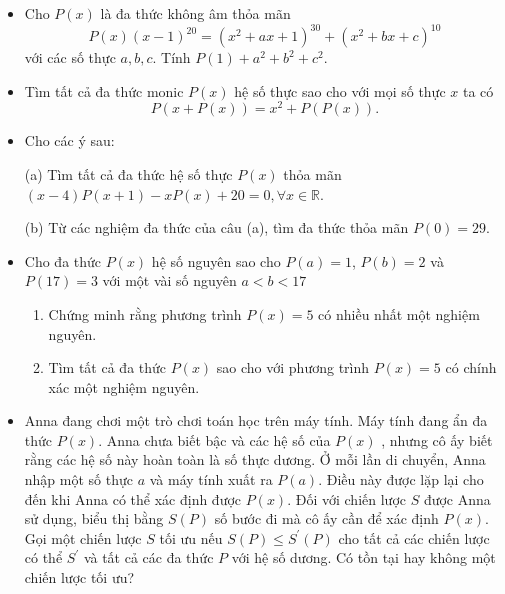 \documentclass[11pt]{scrartcl}
\begin{document}
\begin{itemize}[label=, leftmargin=0em, itemsep=0.5em]
        \item \begin{btvn}
            Cho $P(x)$ là đa thức không âm thỏa mãn
            $$
            P(x)(x-1)^{20}=\left(x^2+a x+1\right)^{30}+\left(x^2+b x+c\right)^{10}
            $$
            với các số thực $a, b, c$. Tính $P(1)+a^2+b^2+c^2$.
        \end{btvn}

        \item \begin{btvn}
            Tìm tất cả đa thức monic $P(x)$ hệ số thực sao cho với mọi số thực $x$ ta có
            $$
            P(x+P(x))=x^2+P(P(x)) .
            $$
        \end{btvn}

        \item \begin{btvn}
            Cho các ý sau:

            (a) Tìm tất cả đa thức hệ số thực $P(x)$ thỏa mãn $(x-4) P(x+1)-x P(x)+20=0, \forall x \in \mathbb{R}$.

            (b) Từ các nghiệm đa thức của câu (a), tìm đa thức thỏa mãn $P(0) = 29$.
        \end{btvn}

        \item \begin{btvn}
            Cho đa thức $P(x)$ hệ số nguyên sao cho $P(a) = 1$, $P(b) = 2$ và $P(17) = 3$ với một vài số nguyên $a < b < 17$
            \begin{enumerate}[label=(\alph*)]
                \item Chứng minh rằng phương trình $P(x) = 5$ có nhiều nhất một nghiệm nguyên.
                \item Tìm tất cả đa thức $P(x)$ sao cho với phương trình $P(x) = 5$ có chính xác một nghiệm nguyên.
            \end{enumerate}
        \end{btvn}

        \item \begin{btvn}
            Anna đang chơi một trò chơi toán học trên máy tính. Máy tính đang ẩn đa thức $P(x)$. Anna chưa biết bậc và các hệ số của $P(x)$ , nhưng cô ấy biết rằng các hệ số này hoàn toàn là số thực dương. Ở mỗi lần di chuyển, Anna nhập một số thực $a$ và máy tính xuất ra $P(a)$. Điều này được lặp lại cho đến khi Anna có thể xác định được $P(x)$. Đối với chiến lược $S$ được Anna sử dụng, biểu thị bằng $S(P)$ số bước đi mà cô ấy cần để xác định $P(x)$. Gọi một chiến lược $S$ tối ưu nếu $S(P) \leq S^{\prime}(P)$ cho tất cả các chiến lược có thể $S^{\prime}$ và tất cả các đa thức $P$ với hệ số dương. Có tồn tại hay không một chiến lược tối ưu?
        \end{btvn}


\end{itemize}
\end{document}
